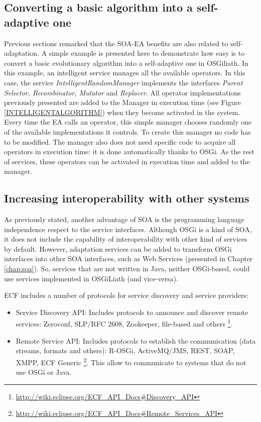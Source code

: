 \subsection{Converting a basic algorithm into a self-adaptive one}

Previous sections remarked that the SOA-EA benefits are also related to self-adaptation. A simple example is presented here to demonstrate how easy is to convert a basic evolutionary algorithm into a self-adaptive one in OSGiliath. In this example, an intelligent service manages all the available operators. In this case, the service {\em IntelligentRandomManager} implements the interfaces {\em Parent Selector, Recombinator, Mutator} and {\em Replacer}. All operator implementations previously presented are added to the Manager in execution time (see Figure \ref{INTELLIGENTALGORITHM}) when they become activated in the system. Every time the EA calls an operator, this simple manager chooses randomly one of the available implementations it controls. To create this manager no code has to be modified. The manager also does not need specific code to acquire all operators in execution time: it is done automatically thanks to OSGi. As the rest of services, these operators can be activated in execution time and added to the manager. 



\subsection{Increasing interoperability with other systems}

As previously stated, another advantage of SOA is the programming language independence respect to the service interfaces. Although OSGi is a kind of SOA, it does not include  the capability of interoperability with other kind of services by default. However, adaptation services can be added to transform OSGi interfaces into other SOA interfaces, such as Web Services (presented in Chapter \ref{chap:soa}). So, services that are not written in Java, neither OSGi-based, could use services implemented in OSGiLiath (and vice-versa).

ECF includes a number of protocols for service discovery and service providers:
\begin{itemize}
\item Service Discovery API: Includes protocols to announce and discover remote services: Zeroconf, SLP/RFC 2608, Zookeeper, file-based and others \footnote{\url{http://wiki.eclipse.org/ECF_API_Docs\#Discovery_API}}.
\item Remote Service API: Includes protocols to establish the communication (data streams, formats and others): R-OSGi, ActiveMQ/JMS, REST, SOAP, XMPP, ECF Generic \footnote{\url{http://wiki.eclipse.org/ECF_API_Docs\#Remote_Services_API}}. This allow to communicate to systems that do not use OSGi or Java.
\end{itemize}

